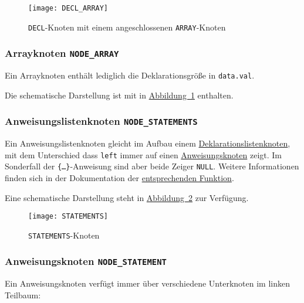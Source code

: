 \begin{figure}[h!]
\label{fig:declnode}
\centering
\texttt{[image: DECL\_ARRAY]}
\caption{\texttt{DECL}-Knoten mit einem angeschlossenen \texttt{ARRAY}-Knoten}
\end{figure}

\subsubsection{Arrayknoten \texttt{NODE\_ARRAY}}
\label{sec:arraynode}
Ein Arrayknoten enthält lediglich die Deklarationsgröße in \texttt{data.val}.

Die schematische Darstellung ist mit in \hyperref[fig:declnode]{Abbildung~\ref{fig:declnode}} enthalten.

\subsubsection{Anweisungslistenknoten \texttt{NODE\_STATEMENTS}}
\label{sec:stmtsnode}
Ein Anweisungslistenknoten gleicht im Aufbau einem \hyperref[sec:declsnode]{Deklarationslistenknoten},
mit dem Unterschied dass \texttt{left} immer auf einen \hyperref[sec:stmtnode]{Anweisungsknoten} zeigt.
Im Sonderfall der \texttt{\{\ldots\}}-Anweisung sind aber beide Zeiger \texttt{NULL}.
Weitere Informationen finden sich in der Dokumentation der \hyperref[sec:parsestatement]{entsprechenden Funktion}.

Eine schematische Darstellung steht in \hyperref[fig:stmtsnode]{Abbildung~\ref{fig:stmtsnode}} zur Verfügung.

\begin{figure}[h!]
\label{fig:stmtsnode}
\centering
\texttt{[image: STATEMENTS]}
\caption{\texttt{STATEMENTS}-Knoten}
\end{figure}

\subsubsection{Anweisungsknoten \texttt{NODE\_STATEMENT}}
\label{sec:stmt}
Ein Anweisungsknoten verfügt immer über verschiedene Unterknoten im linken Teilbaum:


